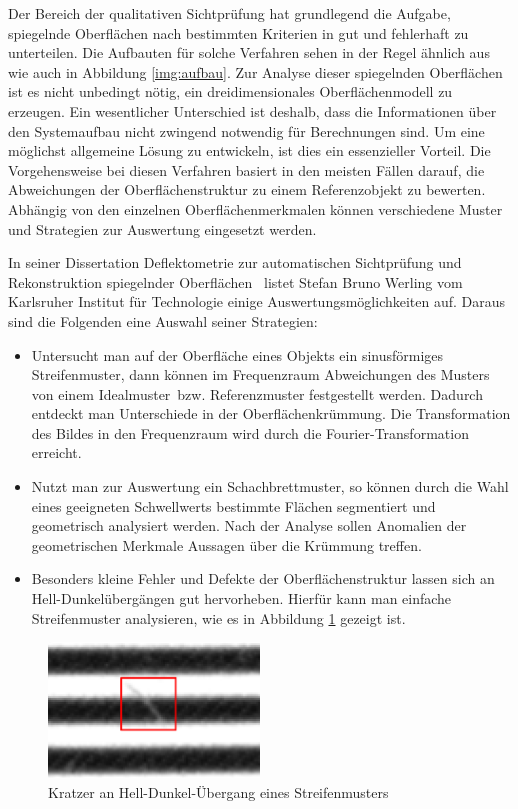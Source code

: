 Der Bereich der qualitativen Sichtprüfung hat grundlegend die Aufgabe, spiegelnde Oberflächen nach bestimmten Kriterien in gut und fehlerhaft zu unterteilen.
Die Aufbauten für solche Verfahren sehen in der Regel ähnlich aus wie auch in Abbildung \ref{img:aufbau}.
Zur Analyse dieser spiegelnden Oberflächen ist es nicht unbedingt nötig, ein dreidimensionales Oberflächenmodell zu erzeugen.
Ein wesentlicher Unterschied ist deshalb, dass die Informationen über den Systemaufbau nicht zwingend notwendig für Berechnungen sind.
Um eine möglichst allgemeine Lösung zu entwickeln, ist dies ein essenzieller Vorteil.
Die Vorgehensweise bei diesen Verfahren basiert in den meisten Fällen darauf, die Abweichungen der Oberflächenstruktur zu einem Referenzobjekt zu bewerten.
Abhängig von den einzelnen Oberflächenmerkmalen können verschiedene Muster und Strategien zur Auswertung eingesetzt werden.

\p
In seiner Dissertation \glqq Deflektometrie zur automatischen Sichtprüfung und Rekonstruktion spiegelnder Oberflächen\grqq ~\cite{kit_werling} listet Stefan Bruno Werling vom Karlsruher Institut für Technologie einige Auswertungsmöglichkeiten auf.
Daraus sind die Folgenden eine Auswahl seiner Strategien:

\begin{itemize}
	\item Untersucht man auf der Oberfläche eines Objekts ein sinusförmiges Streifenmuster, dann können im Frequenzraum Abweichungen des Musters von einem \glqq Idealmuster\grqq ~bzw. Referenzmuster festgestellt werden.
	Dadurch entdeckt man Unterschiede in der Oberflächenkrüm\-mung.
	Die Transformation des Bildes in den Frequenzraum wird durch die Fourier-Transformation erreicht.
	
	\item Nutzt man zur Auswertung ein Schachbrettmuster, so können durch die Wahl eines geeigneten Schwellwerts bestimmte Flächen segmentiert und geometrisch analysiert werden.
	Nach der Analyse sollen Anomalien der geometrischen Merkmale Aussagen über die Krümmung treffen.
	
	\item Besonders kleine Fehler und Defekte der Oberflächenstruktur lassen sich an Hell-Dunkelübergängen gut hervorheben.
	Hierfür kann man einfache Streifenmuster analysieren, wie es in Abbildung \ref{img:scratch} gezeigt ist.
\end{itemize}

\begin{figure}[H]
	\centering
	\includegraphics[width=0.5\textwidth]{02_grundlagenZurDeflektometrie/qualitativeSichtpruefung/figures/scratch}
	\caption[Kratzer an Hell-Dunkel-Übergang eines Streifenmusters]{Kratzer an Hell-Dunkel-Übergang eines Streifenmusters}
	\label{img:scratch}
\end{figure}

